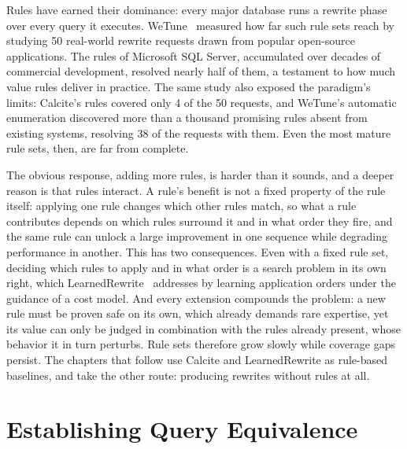 Rules have earned their dominance: every major database runs a
rewrite phase over every query it executes. WeTune~\cite{wetune}
measured how far such rule sets reach by studying 50 real-world
rewrite requests drawn from popular open-source applications. The
rules of Microsoft SQL Server, accumulated over decades of
commercial development, resolved nearly half of them, a testament to
how much value rules deliver in practice. The same study also
exposed the paradigm's limits: Calcite's rules covered only 4 of the
50 requests, and WeTune's automatic enumeration discovered more than
a thousand promising rules absent from existing systems, resolving
38 of the requests with them. Even the most mature rule sets, then,
are far from complete.

The obvious response, adding more rules, is harder than it sounds,
and a deeper reason is that rules interact. A rule's benefit is not
a fixed property of the rule itself: applying one rule changes which
other rules match, so what a rule contributes depends on which rules
surround it and in what order they fire, and the same rule can
unlock a large improvement in one sequence while degrading
performance in another. This has two consequences. Even with a fixed
rule set, deciding which rules to apply and in what order is a
search problem in its own right, which LearnedRewrite~\cite{LR}
addresses by learning application orders under the guidance of a
cost model. And every extension compounds the problem: a new rule
must be proven safe on its own, which already demands rare
expertise, yet its value can only be judged in combination with the
rules already present, whose behavior it in turn perturbs. Rule sets
therefore grow slowly while coverage gaps persist. The chapters that
follow use Calcite and LearnedRewrite as rule-based baselines, and
take the other route: producing rewrites without rules at all.

\section{Establishing Query Equivalence}
\label{sec:bg:equivalence}

